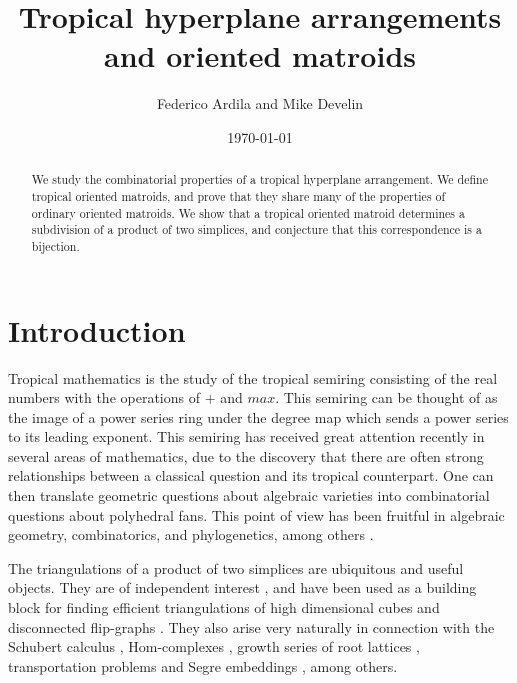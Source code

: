 \documentclass[11pt]{amsart}
\begin{document}
\title{Tropical hyperplane arrangements and oriented matroids}
\author{Federico Ardila and Mike Develin}
\address{Federico Ardila, San Francisco State University 1600 Holloway Ave., San Francisco, CA, USA\\ Mike Develin, American Institute of Mathematics, 360 Portage 
Ave., Palo Alto, CA, USA}
\date{\today}

\begin{abstract}
We study the combinatorial properties of a tropical hyperplane arrangement. We define tropical oriented matroids, and prove that they share many of the properties of ordinary oriented matroids.
We show that a tropical oriented matroid determines a subdivision of a product of two simplices, and conjecture that this correspondence is a bijection. 
\end{abstract}

\maketitle

\section{Introduction}

Tropical mathematics is the study of the tropical semiring consisting of the real numbers with the operations of $+$ and $max$. This semiring can be thought of as the image of a power series ring under the 
degree map which sends a power series to its leading exponent.
This semiring has received great attention recently in several areas of mathematics, due to the discovery that there are often strong relationships between a classical question and its tropical counterpart. 
One can then translate geometric questions about algebraic varieties into combinatorial questions about polyhedral fans. 
This point of view has been fruitful in algebraic geometry, combinatorics, and phylogenetics, among others
 \cite{AK, ARW, D, DS, M, RST, SS}.



The triangulations of a
product of two simplices are ubiquitous and useful objects.
They are of
independent interest \cite{Babson, Bayer, Gelfand, Postnikov}, and have been
used as a building block for finding efficient triangulations of
high dimensional cubes \cite{Haiman, Orden} and disconnected
flip-graphs \cite{Santosflips, Santostoric}. They also arise very
naturally in connection with the Schubert calculus \cite{AB},
Hom-complexes \cite{Pfeifle}, growth series of root lattices \cite{Seashore}, transportation problems and Segre embeddings \cite{Sturmfels}, among others.
\end{document}
